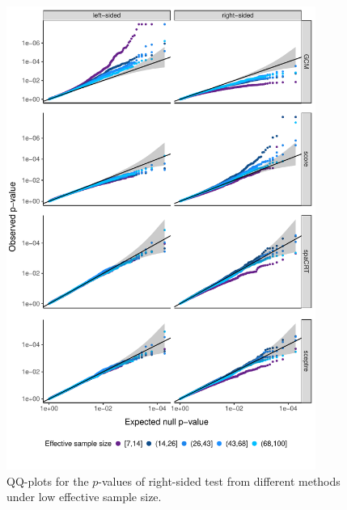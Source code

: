 \documentclass[12pt]{article}
\theoremstyle{definition}
\begin{document}
\begin{figure}[!ht]
	\centering
	\includegraphics[width=0.9\textwidth]{figures-and-tables/facet_plot_different_withglmnb_100.pdf}
	\caption{QQ-plots for the $p$-values of right-sided test from different methods under low effective sample size.}
	\label{fig:qqplot_lowess}
\end{figure}
\end{document}
